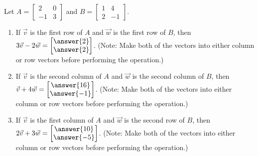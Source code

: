 \documentclass{ximera}
\begin{document}
\begin{example}
    Let $A=\begin{bmatrix} 2 & 0 \\ -1 & 3 \end{bmatrix}$ and $B=\begin{bmatrix} 1 & 4 \\ 2 & -1 \end{bmatrix}$.
    \begin{enumerate}
        \item If $\vec{v}$ is the first row of $A$ and $\vec{w}$ is the first row of $B$, then $3\vec{v}-2\vec{w} = \begin{bmatrix} \answer{2} \\ \answer{2} \end{bmatrix}$. (Note: Make both of the vectors into either column or row vectors before performing the operation.)

        \item If $\vec{v}$ is the second column of $A$ and $\vec{w}$ is the second column of $B$, then $\vec{v}+4\vec{w} = \begin{bmatrix} \answer{16} \\ \answer{-1} \end{bmatrix}$. (Note: Make both of the vectors into either column or row vectors before performing the operation.)

        \item If $\vec{v}$ is the first column of $A$ and $\vec{w}$ is the second row of $B$, then $2\vec{v}+3\vec{w} = \begin{bmatrix} \answer{10} \\ \answer{-5} \end{bmatrix}$. (Note: Make both of the vectors into either column or row vectors before performing the operation.)
    \end{enumerate}
\end{example}
\end{document}
